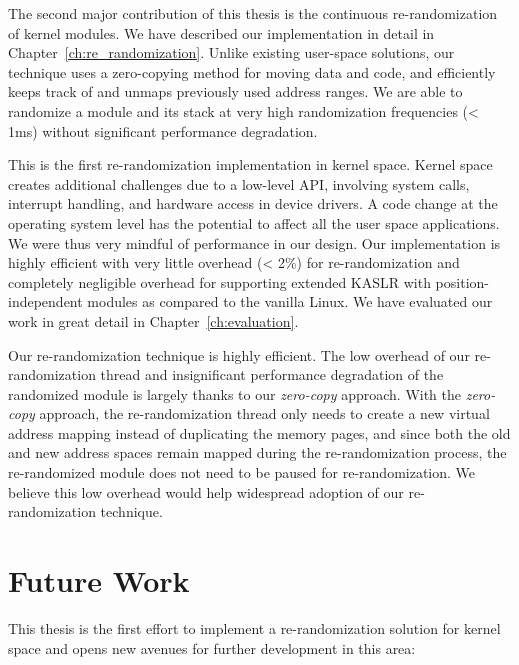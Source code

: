 The second major contribution of this thesis is the continuous re-randomization of kernel modules. We have described our implementation in detail in Chapter~\ref{ch:re_randomization}. Unlike existing user-space solutions, our technique uses a zero-copying method for moving data and code, and efficiently keeps track of and unmaps previously used address ranges. We are able to randomize a module and its stack at very high randomization frequencies (< 1ms) without significant performance degradation.

This is the first re-randomization implementation in kernel space. Kernel space creates additional challenges due to a low-level API, involving system calls, interrupt handling, and hardware access in device drivers. A code change at the operating system level has the potential to affect all the user space applications. We were thus very mindful of performance in our design. Our implementation is highly efficient with very little overhead (< 2\%) for re-randomization and completely negligible overhead for supporting extended KASLR with position-independent modules as compared to the vanilla Linux. We have evaluated our work in great detail in Chapter~\ref{ch:evaluation}.

Our re-randomization technique is highly efficient. The low overhead of our re-randomization thread and insignificant performance degradation of the randomized module is largely thanks to our \textit{zero-copy} approach. With the \textit{zero-copy} approach, the re-randomization thread only needs to create a new virtual address mapping instead of duplicating the memory pages, and since both the old and new address spaces remain mapped during the re-randomization process, the re-randomized module does not need to be paused for re-randomization. We believe this low overhead would help widespread adoption of our re-randomization technique.

\section{Future Work}
This thesis is the first effort to implement a re-randomization solution for kernel space and opens new avenues for further development in this area:


